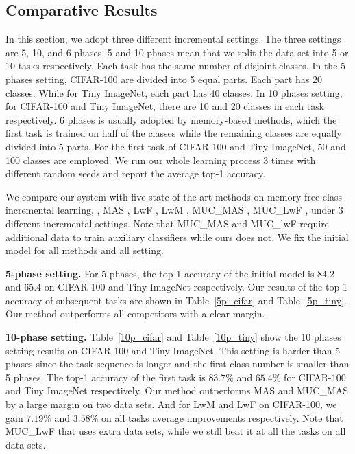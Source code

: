 \documentclass[10pt,twocolumn,letterpaper]{article}
\begin{document}
\subsection{Comparative Results}
In this section, we adopt three different incremental settings.
The three settings are 5, 10, and 6 phases.
5 and 10 phases mean that we split the data set into 5 or 10 tasks respectively. Each task has the same number of disjoint classes.
In the 5 phases setting, CIFAR-100 are divided into 5 equal parts. Each part has 20 classes. While for Tiny ImageNet, each part has 40 classes. 
In 10 phases setting, for CIFAR-100 and Tiny ImageNet, there are 10 and 20 classes in each task respectively.
6 phases is usually adopted by memory-based methods, which the first task is trained on half of the classes while the remaining classes are equally divided into 5 parts.
For the first task of CIFAR-100 and Tiny ImageNet, 50 and 100 classes are employed.
We run our whole learning process 3 times with different random seeds and report the average top-1 accuracy.

We compare our system with five state-of-the-art methods on memory-free class-incremental learning, \ie, MAS \cite{aljundi2018memory}, LwF \cite{li2017learning}, LwM \cite{dhar2019learning}, MUC\_MAS \cite{liumore}, MUC\_LwF \cite{liumore}, under 3 different incremental settings. Note that MUC\_MAS and MUC\_lwF require additional data to train auxiliary classifiers while ours does not. We fix the initial model for all methods and all setting.


\textbf{5-phase setting.}
For 5 phases, the top-1 accuracy of the initial model is 84.2 and 65.4 on CIFAR-100 and Tiny ImageNet respectively. Our results of the top-1 accuracy of subsequent tasks are shown in Table~\ref{5p_cifar} and Table~\ref{5p_tiny}. Our method outperforms all competitors with a clear margin.

\textbf{10-phase setting.}
Table~\ref{10p_cifar} and Table~\ref{10p_tiny} show the 10 phases setting results on CIFAR-100 and Tiny ImageNet. This setting is harder than 5 phases since the task sequence is longer and the first class number is smaller than 5 phases.
The top-1 accuracy of the first task is $83.7\%$ and $65.4\%$ for CIFAR-100 and Tiny ImageNet respectively. 
Our method outperforms MAS and MUC\_MAS by a large margin on two data sets. 
And for LwM and LwF on CIFAR-100, we gain $7.19\%$ and $3.58\%$ on all tasks average improvements respectively.
Note that MUC\_LwF that uses extra data sets, while we still beat it at all the tasks on all data sets.
\end{document}
